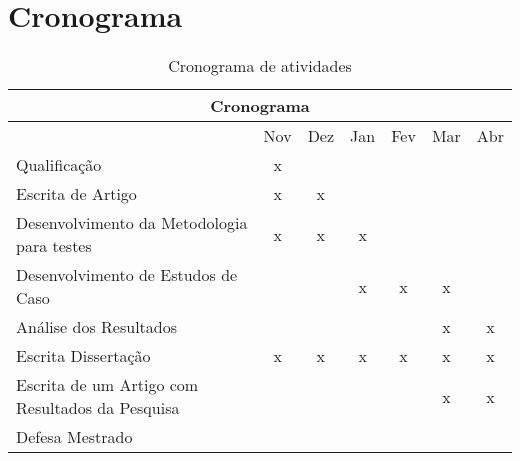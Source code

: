 \chapter{Cronograma}

\begin{table}[ht]
\centering
\caption{Cronograma de atividades}
\label{my-label}
\begin{tabular}{|l|c|c|c|c|c|c|}
\hline
\multicolumn{7}{|c|}{Cronograma}                                                                                                                                                                                  \\ \hline
                                                & \multicolumn{1}{l|}{Nov} & \multicolumn{1}{l|}{Dez} & \multicolumn{1}{l|}{Jan} & \multicolumn{1}{l|}{Fev} & \multicolumn{1}{l|}{Mar} & \multicolumn{1}{l|}{Abr} \\ \hline
Qualificação                                    & x                        &                          &                          &                          &                          &                          \\ \hline
Escrita de Artigo                               & x                        & x                        &                          &                          &                          &                          \\ \hline
Desenvolvimento da Metodologia para testes      & x                        & x                        & x                        &                          &                          &                          \\ \hline
Desenvolvimento de Estudos de Caso              &                          &                          & x                        & x                        & x                        &                          \\ \hline
Análise dos Resultados                          &                          &                          &                          &                          & x                        & x                        \\ \hline
Escrita Dissertação                             & x                        & x                        & x                        & x                        & x                        & x                        \\ \hline
Escrita de um Artigo com Resultados da Pesquisa &                          &                          &                          &                          & x                        & x                        \\ \hline
Defesa Mestrado                                 &                          &                          &                          &                          &                          &                          \\ \hline
\end{tabular}
\end{table}